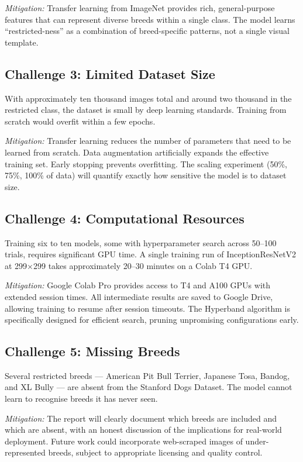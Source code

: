 \textit{Mitigation:} Transfer learning from ImageNet provides rich, general-purpose features that can represent diverse breeds within a single class. The model learns ``restricted-ness'' as a combination of breed-specific patterns, not a single visual template.

\subsection{Challenge 3: Limited Dataset Size}

With approximately ten thousand images total and around two thousand in the restricted class, the dataset is small by deep learning standards. Training from scratch would overfit within a few epochs.

\textit{Mitigation:} Transfer learning reduces the number of parameters that need to be learned from scratch. Data augmentation artificially expands the effective training set. Early stopping prevents overfitting. The scaling experiment (50\%, 75\%, 100\% of data) will quantify exactly how sensitive the model is to dataset size.

\subsection{Challenge 4: Computational Resources}

Training six to ten models, some with hyperparameter search across 50--100 trials, requires significant GPU time. A single training run of InceptionResNetV2 at 299$\times$299 takes approximately 20--30 minutes on a Colab T4 GPU.

\textit{Mitigation:} Google Colab Pro provides access to T4 and A100 GPUs with extended session times. All intermediate results are saved to Google Drive, allowing training to resume after session timeouts. The Hyperband algorithm is specifically designed for efficient search, pruning unpromising configurations early.

\subsection{Challenge 5: Missing Breeds}

Several restricted breeds --- American Pit Bull Terrier, Japanese Tosa, Bandog, and XL Bully --- are absent from the Stanford Dogs Dataset. The model cannot learn to recognise breeds it has never seen.

\textit{Mitigation:} The report will clearly document which breeds are included and which are absent, with an honest discussion of the implications for real-world deployment. Future work could incorporate web-scraped images of under-represented breeds, subject to appropriate licensing and quality control.
